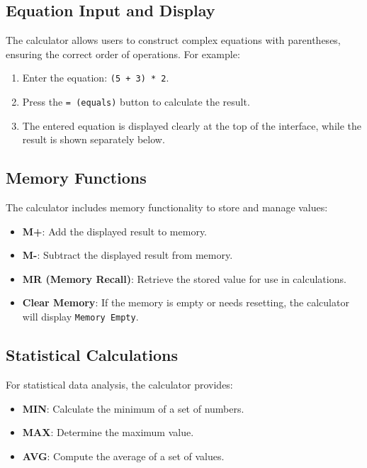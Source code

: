 \documentclass[a4paper,12pt]{article}
\begin{document}
\subsection{Equation Input and Display}

The calculator allows users to construct complex equations with parentheses, ensuring the correct order of operations. For example:

\begin{enumerate}
    \item Enter the equation: \texttt{(5 + 3) * 2}.
    \item Press the \texttt{= (equals)} button to calculate the result.
    \item The entered equation is displayed clearly at the top of the interface, while the result is shown separately below.
\end{enumerate}

\subsection{Memory Functions}

The calculator includes memory functionality to store and manage values:

\begin{itemize}
    \item \textbf{M+}: Add the displayed result to memory.
    \item \textbf{M-}: Subtract the displayed result from memory.
    \item \textbf{MR (Memory Recall)}: Retrieve the stored value for use in calculations.
    \item \textbf{Clear Memory}: If the memory is empty or needs resetting, the calculator will display \texttt{Memory Empty}.
\end{itemize}

\subsection{Statistical Calculations}

For statistical data analysis, the calculator provides:

\begin{itemize}
    \item \textbf{MIN}: Calculate the minimum of a set of numbers.
    \item \textbf{MAX}: Determine the maximum value.
    \item \textbf{AVG}: Compute the average of a set of values.
\end{itemize}
\end{document}
